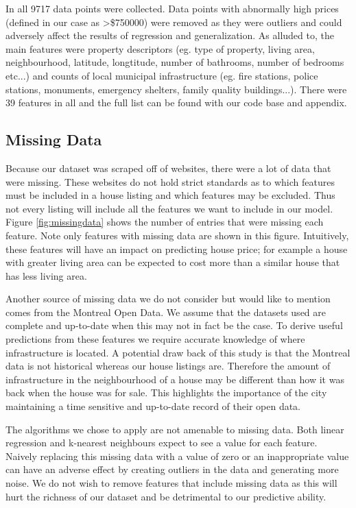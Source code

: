 \documentclass{acm_proc_article-sp}
\begin{document}
	In all 9717 data points were collected. Data points with abnormally high prices (defined in our case as >\$750000) were removed as they were outliers and could adversely affect the results of regression and generalization. As alluded to, the main features were property descriptors (eg. type of property, living area, neighbourhood, latitude, longtitude, number of bathrooms, number of bedrooms etc...) and counts of local municipal infrastructure (eg. fire stations, police stations, monuments, emergency shelters, family quality buildings...). There were 39 features in all and the full list can be found with our code base and appendix.
	
\subsection{Missing Data}

	Because our dataset was scraped off of websites, there were a lot of data that were missing. These websites do not hold strict standards as to which features must be included in a house listing and which features may be excluded. Thus not every listing will include all the features we want to include in our model. Figure \ref{fig:missingdata} shows the number of entries that were missing each feature. Note only features with missing data are shown in this figure. Intuitively, these features will have an impact on predicting house price; for example a house with greater living area can be expected to cost more than a similar house that has less living area. 
	
	Another source of missing data we do not consider but would like to mention comes from the Montreal Open Data. We assume that the datasets used are complete and up-to-date when this may not in fact be the case. To derive useful predictions from these features we require accurate knowledge of where infrastructure is located. A potential draw back of this study is that the Montreal data is not historical whereas our house listings are. Therefore the amount of infrastructure in the neighbourhood of a house may be different than how it was back when the house was for sale. This highlights the importance of the city maintaining a time sensitive and up-to-date record of their open data.
	
	The algorithms we chose to apply are not amenable to missing data. Both linear regression and k-nearest neighbours expect to see a value for each feature. Naively replacing this missing data with a value of zero or an inappropriate value can have an adverse effect by creating outliers in the data and generating more noise. We do not wish to remove features that include missing data as this will hurt the richness of our dataset and be detrimental to our predictive ability.
	
\end{document}
